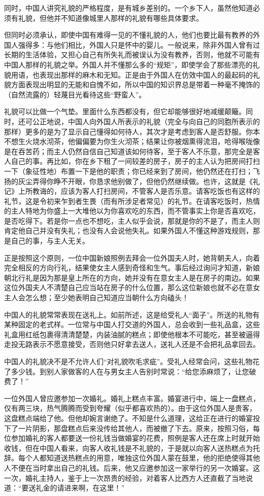 \documentclass[12pt,oneside]{book}
\begin{document}
\begin{common-format}
同时，中国人讲究礼貌的严格程度，是有城乡差别的。一个乡下人，虽然他知道必须有礼貌，但他并不知道像城里人那样的礼貌有哪些具体要求。 

但同时必须承认，即使中国有难得一见的不懂礼貌的人，他们也要比最有教养的外国人强得多：与他们相比，外国人只是怀中的婴儿。一般说来，除非外国人曾有过长期的生活体验，又担心自己有所失礼而被误认为没有教养，否则，他就不可能有中国人那样的礼貌之举。外国人并不懂那么多的“规矩”，即使学会了那些漂亮的礼貌用语，也表现出那样的麻木和无知。正是由于外国人在仿效中国人的最起码的礼貌方面表现出明显的无能和自愧不如，所以中国的知识界总是带着一种毫不掩饰的（自然流露的）轻蔑目光看待这些“野蛮人”。 

礼貌可以比做一个气垫。里面什么东西都没有，但它却能够很好地减缓颠簸。同时，还可公正地说，中国人向外国人所表示的礼貌（完全与向自己的同胞所表示的那样）更多的是为了显示自己懂得如何待人，其次才是考虑到客人是否舒服。你本不想生火烧水沏茶，他偏偏要为你生火沏茶；结果让你被烟熏得流泪，呛得喉咙像是在吞苦药；而主人仍然自信自己知道该如何待客，至于客人不乐意，那完全是客人自己的事。再比如，你在乡下租了一间较差的房子，房子的主人认为把房间打扫一下（象征性地）布置一下是他的职责；你已经来到了房间，他仍然还在打扫；飞扬的灰尘弄得你睁不开眼，你恳求他别做了，但他仍然继续做。也许，这就是《礼记》上所教诲的，应该为客人打扫房间，不管客人是否乐意。请客吃饭也有这样的礼节，这是令初来乍到者生畏（而有所涉足者常见）的礼节。在请客吃饭时，热情的主人特地为你盛上一大堆他以为你喜欢吃的东西，而不管事实上你是否喜欢吃，是否吃得下。若是你一点也不想吃，主人似乎会说，那就是你的不是了，而主人则肯定他自己并没有失礼；也没有人会说他失礼。如果外国人不懂这种游戏规则，那是自己的事，与主人无关。 

正是按照这个原则，一位中国新娘照例去拜会一位外国夫人时，她背朝夫人，向着完全相反的方向行礼，结果使女主人感到奇怪和生气。事后经过询问才知道，新娘朝北行礼是因为那是皇上所在的方向，她并没有在意女主人是在房子的南边。如果这位外国夫人不清楚自己应当站在房子的什么位置，那么这位新娘也就不必在意女主人会怎么想；至少她表明自己知道应当朝什么方向磕头！ 

中国人的礼貌常常表现在送礼上。如前所述，这是给受礼人“面子”。所送的礼物有某种固定的老式样。一位常与中国人打交道的外国人，总会收到一些礼品盒，这些礼盒用红纸包裹得清清楚楚，内装油腻的糕点；即使他根本不可能吃，甚至被逼得走投无路表示不愿意接受，否则他只好拿去送人，送礼人还是不会把礼品拿回去。 

中国人的礼貌决不是不允许人们“对礼貌吹毛求疵”。受礼人经常会问，这些礼物花了多少钱。到别人家做客的人在与男女主人告别时常说：“给您添麻烦了，让您破费了！” 

一位外国人曾应邀参加一次婚礼。婚礼上糕点丰富。婚宴进行中，端上一盘糕点，仅有两三块，热气腾腾而受到夸耀（似乎都喜欢热的）。由于这位外国人是贵客，这盘糕点端给了他。但他却婉言谢绝了。不知是什么道理，这给正在进行的婚宴投下了一片阴影，那盘糕点后来没传给其他人，而被撤了下去。原来，按照习俗，每位参加婚礼的客人都要送一份礼钱当做婚宴的花费，照例是客人还在席上时就开始收钱，但在中国人看来，向客人收礼钱是不礼貌的，于是就以向客人送热糕点为托辞。每个人都知道送热糕点的用意，唯独这位外国人蒙在鼓里，他的拒绝使得其他人不便在当时拿出自己的礼钱。后来，他又应邀参加这一家举行的另一次婚宴。这一次，婚礼主持人，鉴于上一次昂贵的经验，对着客人比西方人还直截了当地说道：“要送礼金的请进来啊，在这里！”


\end{common-format}
\end{document}
